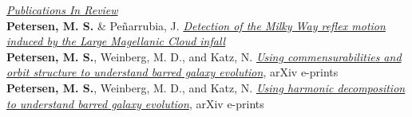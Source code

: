 \documentclass[margin, 11pt]{res} %
\begin{document}
\begin{resume}

\underline{\sl Publications In Review} \\
{\bf \textcolor{blueshade}{Petersen, M. S.}} \& Pe{\~n}arrubia, J.  \href{https://michael-petersen.github.io}{\it Detection of the Milky Way reflex motion induced by the Large Magellanic Cloud infall}\\
{\bf \textcolor{blueshade}{Petersen, M. S.}}, Weinberg, M. D., and Katz, N. \href{https://ui.adsabs.harvard.edu/abs/2019arXiv190205081P/abstract}{\it Using commensurabilities and orbit structure to understand barred galaxy evolution}, arXiv e-prints\\
{\bf \textcolor{blueshade}{Petersen, M. S.}}, Weinberg, M. D., and Katz, N. \href{https://ui.adsabs.harvard.edu/abs/2019arXiv190308203P/abstract}{\it Using harmonic decomposition to understand barred galaxy evolution}, arXiv e-prints\\


\pagebreak





\end{resume}
\end{document}
